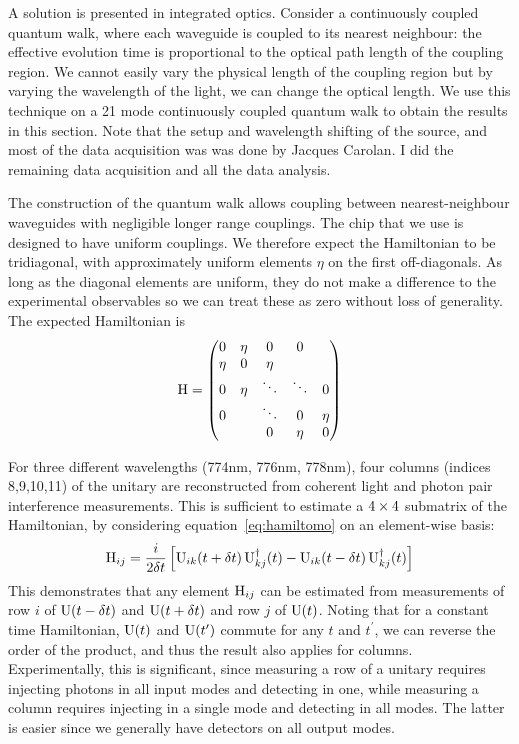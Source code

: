 A solution is presented in integrated optics. Consider a continuously coupled
quantum walk, where each waveguide is coupled to its nearest neighbour: the
effective evolution time is proportional to the optical path length of the
coupling region. We cannot easily vary the physical length of the coupling
region \cite{walks-jasmin} but by varying the wavelength of the light, we can
change the optical length. We use this technique on a 21 mode continuously
coupled quantum walk to obtain the results in this section. Note that the setup
and wavelength shifting of the source, and most of the data acquisition was was
done by Jacques Carolan. I did the remaining data acquisition and all the data
analysis.

The construction of the quantum walk allows coupling between nearest-neighbour
waveguides with negligible longer range couplings. The chip that we use is
designed to have uniform couplings. We therefore expect the Hamiltonian to be
tridiagonal, with approximately uniform elements \(\eta\) on the first
off-diagonals. As long as the diagonal elements are uniform, they do not make a
difference to the experimental observables so we can treat these as zero without
loss of generality. The expected Hamiltonian is
\begin{equation}
  \mathrm{H} = \begin{pmatrix}
  0 & \eta & 0 & 0 \\
  \eta & 0 & \eta \\
  0 & \eta & \ddots & \ddots & 0 \\
  0 & & \ddots & 0 & \eta \\
  & & 0 & \eta & 0
  \end{pmatrix}
\end{equation}

For three different wavelengths (774nm, 776nm, 778nm), four columns (indices
8,9,10,11) of the unitary are reconstructed from coherent light and photon pair
interference measurements. This is sufficient to estimate a \(4 \times 4\)
submatrix of the Hamiltonian, by considering equation~\ref{eq:hamiltomo} on an
element-wise basis:
\begin{equation}
  \mathrm{H}_{ij} = \frac{i}{2 \delta t} \left[ \mathrm{U}_{ik} \!\left( t+\delta t \right) \mathrm{U}_{kj}^{
  \dagger} \!\left(t\right) - \mathrm{U}_{ik} \!\left( t-\delta t \right) \mathrm{U}_{kj}^{\dagger} \!\left(t\right)
  \right]
\end{equation}
This demonstrates that any element \(\mathrm{H}_{ij}\) can be estimated from
measurements of row \(i\) of \(\mathrm{U} \!\left(t-\delta t\right)\) and \(\mathrm{U} \!\left(t+\delta t\right)\)
and row \(j\) of \(\mathrm{U} \!\left(t\right)\). Noting that for a constant time
Hamiltonian, \(\mathrm{U} \!\left(t\right)\) and \(\mathrm{U} \!\left(t^{\prime}\right)\) commute for any
\(t\) and \(t^{\prime}\), we can reverse the order of the product, and thus the
result also applies for columns. Experimentally, this is significant, since
measuring a row of a unitary requires injecting photons in all input modes and
detecting in one, while measuring a column requires injecting in a single mode
and detecting in all modes. The latter is easier since we generally have
detectors on all output modes.

